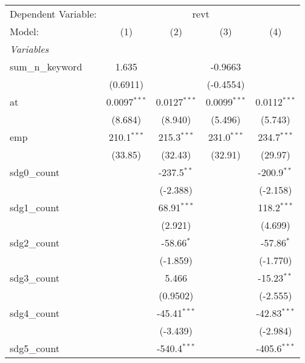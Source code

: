 
\begingroup
\centering
\begin{tabular}{lcccc}
   \tabularnewline \midrule \midrule
   Dependent Variable: & \multicolumn{4}{c}{revt}\\
   Model:            & (1)            & (2)            & (3)            & (4)\\  
   \midrule
   \emph{Variables}\\
   sum\_n\_keyword   & 1.635          &                & -0.9663        &   \\   
                     & (0.6911)       &                & (-0.4554)      &   \\   
   at                & 0.0097$^{***}$ & 0.0127$^{***}$ & 0.0099$^{***}$ & 0.0112$^{***}$\\   
                     & (8.684)        & (8.940)        & (5.496)        & (5.743)\\   
   emp               & 210.1$^{***}$  & 215.3$^{***}$  & 231.0$^{***}$  & 234.7$^{***}$\\   
                     & (33.85)        & (32.43)        & (32.91)        & (29.97)\\   
   sdg0\_count       &                & -237.5$^{**}$  &                & -200.9$^{**}$\\   
                     &                & (-2.388)       &                & (-2.158)\\   
   sdg1\_count       &                & 68.91$^{***}$  &                & 118.2$^{***}$\\   
                     &                & (2.921)        &                & (4.699)\\   
   sdg2\_count       &                & -58.66$^{*}$   &                & -57.86$^{*}$\\   
                     &                & (-1.859)       &                & (-1.770)\\   
   sdg3\_count       &                & 5.466          &                & -15.23$^{**}$\\   
                     &                & (0.9502)       &                & (-2.555)\\   
   sdg4\_count       &                & -45.41$^{***}$ &                & -42.83$^{***}$\\   
                     &                & (-3.439)       &                & (-2.984)\\   
   sdg5\_count       &                & -540.4$^{***}$ &                & -405.6$^{***}$\\   

\end{tabular}
